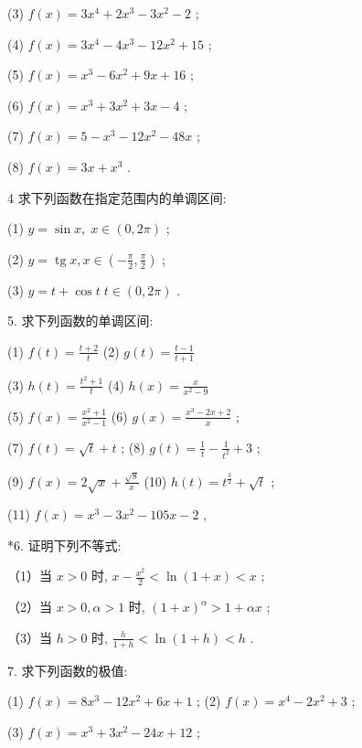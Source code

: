 \documentclass[lang=cn,newtx,12pt,scheme=chinese]{elegantbook}
\begin{document}
(3) \(f\left( x\right) = 3{x}^{4} + 2{x}^{3} - 3{x}^{2} - 2\) ;

(4) \(f\left( x\right) = 3{x}^{4} - 4{x}^{3} - {12}{x}^{2} + {15}\) ;

(5) \(f\left( x\right) = {x}^{3} - 6{x}^{2} + {9x} + {16}\) ;

(6) \(f\left( x\right) = {x}^{3} + 3{x}^{2} + {3x} - 4\) ;

(7) \(f\left( x\right) = 5 - {x}^{3} - {12}{x}^{2} - {48x}\) ;

(8) \(f\left( x\right) = {3x} + {x}^{3}\) .

4 求下列函数在指定范围内的单调区间:

(1) \(y = \sin x,\;x \in \left( {0,{2\pi }}\right)\) ;

(2) \(y = \operatorname{tg}x,x \in \left( {-\frac{\pi }{2},\frac{\pi }{2}}\right)\) ;

(3) \(y = t + \cos t\;t \in \left( {0,{2\pi }}\right)\) .

5. 求下列函数的单调区间:

(1) \(f\left( t\right) = \frac{t + 2}{t}\) (2) \(g\left( t\right) = \frac{t - 1}{t + 1}\)

(3) \(h\left( t\right) = \frac{{t}^{2} + 1}{t}\) (4) \(h\left( x\right) = \frac{x}{{x}^{2} - 9}\)

(5) \(f\left( x\right) = \frac{{x}^{2} + 1}{{x}^{2} - 1}\) (6) \(g\left( x\right) = \frac{{x}^{3} - {2x} + 2}{x}\) ;

(7) \(f\left( t\right) = \sqrt{t} + t\) ; (8) \(g\left( t\right) = \frac{1}{t} - \frac{1}{{t}^{2}} + 3\) ;

(9) \(f\left( x\right) = 2\sqrt{x} + \frac{\sqrt{8}}{x}\) (10) \(h\left( t\right) = {t}^{\frac{3}{2}} + \sqrt{t}\) ;

(11) \(f\left( x\right) = {x}^{3} - 3{x}^{2} - {105x} - 2\) ,

*6. 证明下列不等式:

（1）当 \(x > 0\) 时, \(x - \frac{{x}^{2}}{2} < \ln \left( {1 + x}\right) < x\) ;

（2）当 \(x > 0,\alpha > 1\) 时, \({\left( 1 + x\right) }^{\alpha } > 1 + {\alpha x}\) ;

（3）当 \(h > 0\) 时, \(\frac{h}{1 + h} < \ln \left( {1 + h}\right) < h\) .

7. 求下列函数的极值:

(1) \(f\left( x\right) = 8{x}^{3} - {12}{x}^{2} + {6x} + 1\) ; (2) \(f\left( x\right) = {x}^{4} - 2{x}^{2} + 3\) ;

(3) \(f\left( x\right) = {x}^{3} + 3{x}^{2} - {24x} + {12}\) ;
\end{document}
